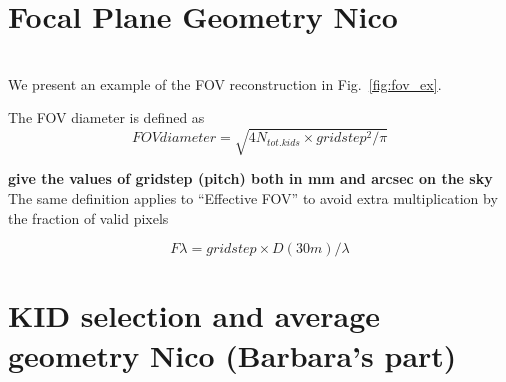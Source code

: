 %
%
%


\section{Focal Plane Geometry {\color{blue} Nico}}
\label{se:fov_geometry}

\\

We present an example of the FOV reconstruction in Fig.~\ref{fig:fov_ex}.

The FOV diameter is defined as 
\begin{equation}
FOV diameter = \sqrt{4 N_{tot. kids} \times gridstep^2/\pi}
\end{equation}

{\bf give the values of gridstep (pitch) both in mm and arcsec on the sky}\\

The same definition applies to ``Effective FOV'' to avoid extra multiplication
by the fraction of valid pixels

\begin{equation}
F\lambda = gridstep\times D(30m)/\lambda
\end{equation}



\section{KID selection and average geometry {\color{blue} Nico (Barbara's part)} }
\label{avg_kidpar}


